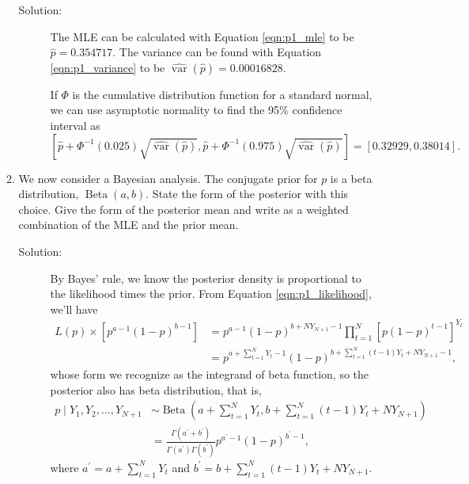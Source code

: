 \documentclass[letterpaper,11pt]{article}
\begin{document}
\begin{enumerate}
\begin{enumerate}
    \begin{description}
    \item[Solution:] The MLE can be calculated with Equation \ref{eqn:p1_mle} to
      be $\boxed{\hat{p} = 0.354717.}$ The variance can be found with Equation
      \ref{eqn:p1_variance} to be
      $\boxed{\hat{\operatorname{var}}\left(\hat{p}\right) = 0.00016828.}$

      If $\Phi$ is the cumulative distribution function for a standard normal,
      we can use asymptotic normality to find the 95\% confidence interval as
      \begin{equation*}
        \left[
          \hat{p} +
          \Phi^{-1}\left(0.025\right)\sqrt{\hat{\operatorname{var}}\left(\hat{p}\right)},
          \hat{p} +
          \Phi^{-1}\left(0.975\right)\sqrt{\hat{\operatorname{var}}\left(\hat{p}\right)}
        \right]
        =
        \boxed{\left[0.32929,0.38014\right].}
      \end{equation*}
    \end{description}
  \item We now consider a Bayesian analysis. The conjugate prior for $p$ is a
    beta distribution, $\operatorname{Beta}\left(a, b\right)$. State the form of
    the posterior with this choice. Give the form of the posterior mean and
    write as a weighted combination of the MLE and the prior mean.

    \begin{description}
    \item[Solution:] By Bayes' rule, we know the posterior density is
      proportional to the likelihood times the prior. From Equation
      \ref{eqn:p1_likelihood}, we'll have
      \begin{align*}
        L\left(p\right) \times \left[
        p^{a-1}\left(1-p\right)^{b-1}
        \right]
        &= p^{a-1}\left(1 - p\right)^{b + NY_{N+1} - 1}
          \prod_{t=1}^N\left[
          p\left(1 - p\right)^{t-1}
          \right]^{Y_t} \\
        &= p^{a + \sum_{t=1}^N Y_t -1}
          \left(1 - p\right)^{b + \sum_{t=1}^N (t-1)Y_t + NY_{N+1} - 1},
      \end{align*}
      whose form we recognize as the integrand of beta function, so the
      posterior also has beta distribution, that is,
      \begin{align}
        p \mid Y_1,Y_2,\ldots,Y_{N+1}
        &\sim \operatorname{Beta}\left(
          a + \sum_{t=1}^N Y_t,
          b + \sum_{t=1}^N (t-1)Y_t + NY_{N+1}
          \right) \nonumber\\
        &= \frac{\Gamma\left(a^\prime + b^\prime\right)}
          {\Gamma\left(a^\prime\right)\Gamma\left(b^\prime\right)}
          p^{a^\prime -1}\left(1 - p\right)^{b^\prime - 1},
          \label{eqn:p1_posterior}
      \end{align}
      where $a^\prime = a + \sum_{t=1}^N Y_t$ and
      $b^\prime = b + \sum_{t=1}^N (t-1)Y_t + NY_{N+1}$.


\end{description}
\end{enumerate}
\end{enumerate}
\end{document}
